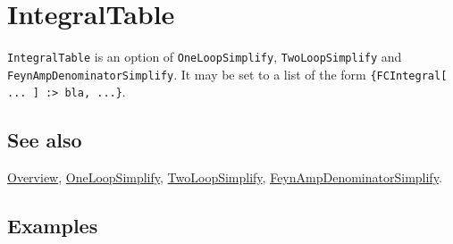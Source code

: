 \documentclass[../FeynCalcManual.tex]{subfiles}
\begin{document}
\hypertarget{integraltable}{
\section{IntegralTable}\label{integraltable}}

\texttt{IntegralTable} is an option of \texttt{OneLoopSimplify},
\texttt{TwoLoopSimplify} and \texttt{FeynAmpDenominatorSimplify}. It may
be set to a list of the form
\texttt{\{\allowbreak{}FCIntegral[\allowbreak{} ... ] :> bla,\ \allowbreak{}...\}}.

\subsection{See also}

\hyperlink{toc}{Overview}, \hyperlink{oneloopsimplify}{OneLoopSimplify},
\hyperlink{twoloopsimplify}{TwoLoopSimplify},
\hyperlink{feynampdenominatorsimplify}{FeynAmpDenominatorSimplify}.

\subsection{Examples}
\end{document}
